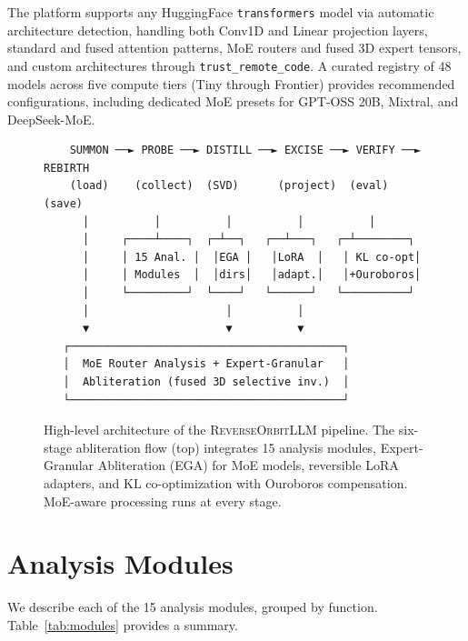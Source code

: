 \documentclass[11pt]{article}
\begin{document}
The platform supports any HuggingFace \texttt{transformers} model via automatic architecture detection, handling both Conv1D and Linear projection layers, standard and fused attention patterns, MoE routers and fused 3D expert tensors, and custom architectures through \texttt{trust\_remote\_code}. A curated registry of 48 models across five compute tiers (Tiny through Frontier) provides recommended configurations, including dedicated MoE presets for GPT-OSS 20B, Mixtral, and DeepSeek-MoE.

\begin{figure}[t]
\centering
\small
\begin{verbatim}
    SUMMON ──► PROBE ──► DISTILL ──► EXCISE ──► VERIFY ──► REBIRTH
    (load)    (collect)  (SVD)      (project)  (eval)     (save)
      │          │          │          │          │
      │     ┌────┴────┐  ┌─┴──┐   ┌──┴───┐   ┌─┴────────┐
      │     │ 15 Anal. │  │EGA │   │LoRA  │   │ KL co-opt│
      │     │ Modules  │  │dirs│   │adapt.│   │+Ouroboros│
      │     └─────────┘  └────┘   └──────┘   └──────────┘
      │                     │          │
      ▼                     ▼          ▼
   ┌──────────────────────────────────────────┐
   │  MoE Router Analysis + Expert-Granular   │
   │  Abliteration (fused 3D selective inv.)  │
   └──────────────────────────────────────────┘
\end{verbatim}
\caption{High-level architecture of the \textsc{ReverseOrbitLLM} pipeline. The six-stage abliteration flow (top) integrates 15 analysis modules, Expert-Granular Abliteration (EGA) for MoE models, reversible LoRA adapters, and KL co-optimization with Ouroboros compensation. MoE-aware processing runs at every stage.}
\label{fig:architecture}
\end{figure}

\section{Analysis Modules}
\label{sec:analysis}

We describe each of the 15 analysis modules, grouped by function. Table~\ref{tab:modules} provides a summary.
\end{document}
